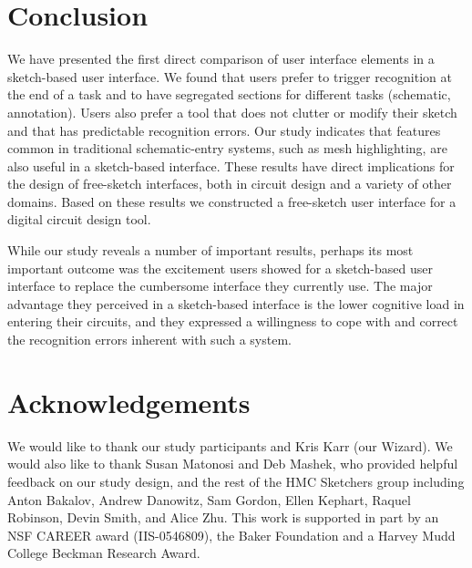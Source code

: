 \documentclass{elsart}
\begin{document}
\section{Conclusion}

We have presented the first direct comparison of user interface
elements in a sketch-based user interface.  We found that users prefer
to trigger recognition at the end of a task and to have segregated
sections for different tasks (schematic, annotation). Users also
prefer a tool that does not clutter or modify their sketch and that
has predictable recognition errors. Our study indicates that features
common in traditional schematic-entry systems, such as mesh
highlighting, are also useful in a sketch-based interface.  These
results have direct implications for the design of free-sketch
interfaces, both in circuit design and a variety of other domains.
Based on these results we constructed a free-sketch user interface for
a digital circuit design tool.

While our study reveals a number of important results, perhaps its
most important outcome was the excitement users showed for a
sketch-based user interface to replace the cumbersome interface they
currently use.  The major advantage they perceived in a sketch-based
interface is the lower cognitive load in entering their circuits, and
they expressed a willingness to cope with and correct the recognition
errors inherent with such a system.

\section{Acknowledgements}
We would like to thank our study participants and Kris Karr (our
Wizard).  We would also like to thank Susan Matonosi and Deb Mashek,
who provided helpful feedback on our study design, and the rest of the
HMC Sketchers group including Anton Bakalov, Andrew Danowitz, Sam
Gordon, Ellen Kephart, Raquel Robinson, Devin Smith, and Alice Zhu.
This work is supported in part by an NSF CAREER award (IIS-0546809),
the Baker Foundation and a Harvey Mudd College Beckman Research Award.






%
%

\end{document}
